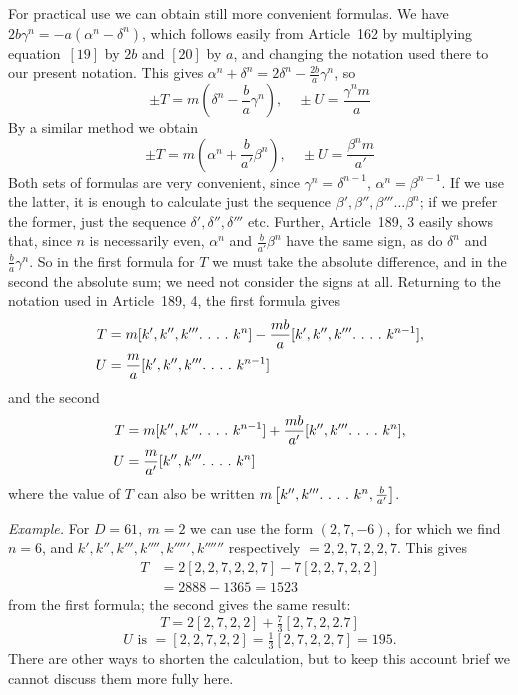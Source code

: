 For practical use we can obtain still more convenient formulas. We have \(2b\gamma^n=-a(\alpha^n-\delta^n)\), which follows easily from Article~162 by multiplying equation~\([19]\) by \(2b\) and \([20]\) by \(a\), and changing the notation used there to our present notation. This gives \(\alpha^n+\delta^n=2\delta^n-\frac{2b}{a}\gamma^n\), so
\[
\pm T=m\left(\delta^n-\frac{b}{a}\gamma^n\right),\quad \pm U=\frac{\gamma^n m}{a}
\]
By a similar method we obtain
\[
\pm T=m\left(\alpha^n+\frac{b}{a'}\beta^n\right),\quad \pm U=\frac{\beta^n m}{a'}
\]
Both sets of formulas are very convenient, since \(\gamma^n=\delta^{n-1}\), \(\alpha^n=\beta^{n-1}\). If we use the latter, it is enough to calculate just the sequence \(\beta',\beta'',\beta'''\ldots\beta^n\); if we prefer the former, just the sequence \(\delta',\delta'',\delta'''\) etc. Further, Article~189, 3 easily shows that, since \(n\) is necessarily even, \(\alpha^n\) and \(\frac{b}{a'}\beta^n\) have the same sign, as do \(\delta^n\) and \(\frac{b}{a}\gamma^n\). So in the first formula for \(T\) we must take the absolute difference, and in the second the absolute sum; we need not consider the signs at all. Returning to the notation used in Article~189, 4, the first formula gives
\[
\begin{aligned}T&=m[k',k'',k'''\ldotp\,\ldotp\,\ldotp\,\ldotp\, k^n]-\frac{mb}{a}[k',k'',k'''\ldotp\,\ldotp\,\ldotp\,\ldotp\, k^{n-1}],\\U&=\frac{m}{a}[k',k'',k'''\ldotp\,\ldotp\,\ldotp\,\ldotp\, k^{n-1}]\end{aligned}
\]
and the second
\[
\begin{aligned}T&=m[k'',k'''\ldotp\,\ldotp\,\ldotp\,\ldotp\, k^{n-1}]+\frac{mb}{a'}[k'',k'''\ldotp\,\ldotp\,\ldotp\,\ldotp\, k^n],\\U&=\frac{m}{a'}[k'',k'''\ldotp\,\ldotp\,\ldotp\,\ldotp\, k^n]\end{aligned}
\]
where the value of \(T\) can also be written \(m\left[k'',k'''\ldotp\,\ldotp\,\ldotp\,\ldotp\, k^n,\frac{b}{a'}\right]\).

\textit{Example.} For \(D=61,\ m=2\) we can use the form \((2,7,-6)\), for which we find \(n=6\), and \(k',k'',k''',k'''',k''''',k''''''\) respectively \(=2,2,7,2,2,7\). This gives
\[
\begin{aligned}T&=2[2,2,7,2,2,7]-7[2,2,7,2,2]\\&=2888-1365=1523\end{aligned}
\]
from the first formula; the second gives the same result:
\[
T=2[2,7,2,2]+\tfrac73[2,7,2,2.7]
\]
\[
U\text{ is }=[2,2,7,2,2]=\tfrac13[2,7,2,2,7]=195.
\]
There are other ways to shorten the calculation, but to keep this account brief we cannot discuss them more fully here.

